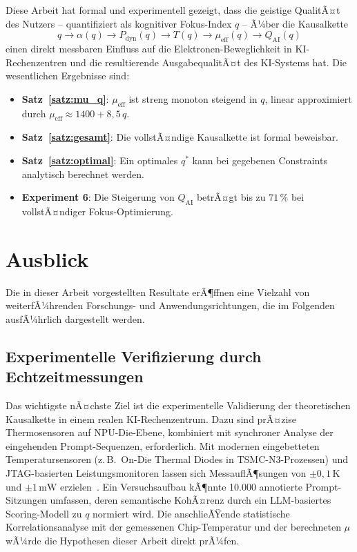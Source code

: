 ﻿\documentclass[a4paper,12pt]{article}
\theoremstyle{definition}
\begin{document}
Diese Arbeit hat formal und experimentell gezeigt, dass die geistige QualitÃ¤t des Nutzers --
quantifiziert als kognitiver Fokus-Index $q$ -- Ã¼ber die Kausalkette
\[
q \to \alpha(q) \to P_{\mathrm{dyn}}(q) \to T(q) \to \mu_{\mathrm{eff}}(q) \to Q_{\mathrm{AI}}(q)
\]
einen direkt messbaren Einfluss auf die Elektronen-Beweglichkeit in KI-Rechenzentren und
die resultierende AusgabequalitÃ¤t des KI-Systems hat. Die wesentlichen Ergebnisse sind:

\begin{itemize}
  \item \textbf{Satz~\ref{satz:mu_q}}: $\mu_{\mathrm{eff}}$ ist streng monoton steigend in $q$,
        linear approximiert durch $\mu_{\mathrm{eff}} \approx 1400 + 8{,}5\,q$.
  \item \textbf{Satz~\ref{satz:gesamt}}: Die vollstÃ¤ndige Kausalkette ist formal beweisbar.
  \item \textbf{Satz~\ref{satz:optimal}}: Ein optimales $q^*$ kann bei gegebenen Constraints
        analytisch berechnet werden.
  \item \textbf{Experiment 6}: Die Steigerung von $Q_{\mathrm{AI}}$ betrÃ¤gt bis zu $71\,\%$
        bei vollstÃ¤ndiger Fokus-Optimierung.
\end{itemize}

\section{Ausblick}

Die in dieser Arbeit vorgestellten Resultate erÃ¶ffnen eine Vielzahl von weiterfÃ¼hrenden
Forschungs- und Anwendungsrichtungen, die im Folgenden ausfÃ¼hrlich dargestellt werden.

\subsection{Experimentelle Verifizierung durch Echtzeitmessungen}

Das wichtigste nÃ¤chste Ziel ist die experimentelle Validierung der theoretischen
Kausalkette in einem realen KI-Rechenzentrum. Dazu sind prÃ¤zise Thermosensoren auf NPU-Die-Ebene,
kombiniert mit synchroner Analyse der eingehenden Prompt-Sequenzen, erforderlich. Mit modernen
eingebetteten Temperatursensoren (z.\,B.\ On-Die Thermal Diodes in TSMC-N3-Prozessen) und
JTAG-basierten Leistungsmonitoren lassen sich MessauflÃ¶sungen von $\pm 0{,}1\,\text{K}$ und
$\pm 1\,\text{mW}$ erzielen~\cite{Skadron2003}. Ein Versuchsaufbau kÃ¶nnte 10.000 annotierte
Prompt-Sitzungen umfassen, deren semantische KohÃ¤renz durch ein LLM-basiertes Scoring-Modell
zu $q$ normiert wird. Die anschlieÃŸende statistische Korrelationsanalyse mit der gemessenen
Chip-Temperatur und der berechneten $\mu$ wÃ¼rde die Hypothesen dieser Arbeit direkt prÃ¼fen.
\end{document}
